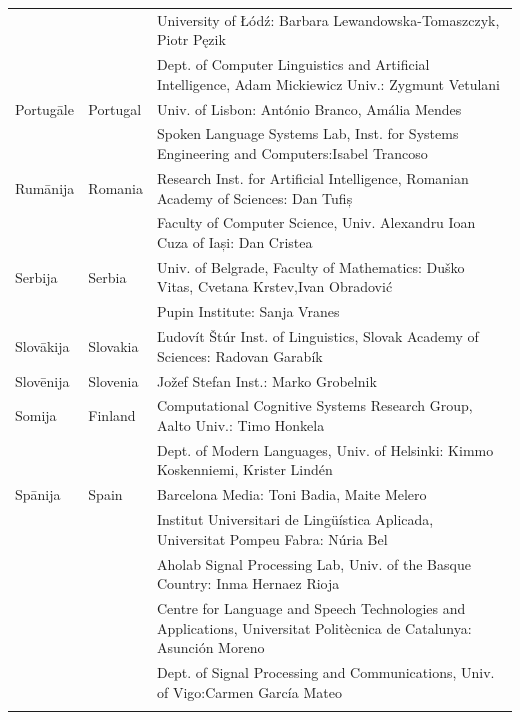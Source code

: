 \begin{longtable}{@{}llp{113mm}@{}}
  & & University of Łódź: Barbara Lewandowska-Tomaszczyk, Piotr Pęzik\\ \addlinespace
  & & Dept. of Computer Linguistics and Artificial Intelligence, Adam Mickiewicz Univ.: Zygmunt Vetulani \\ \addlinespace
  Portugāle & \textcolor{grey1}{Portugal} & Univ. of Lisbon: António Branco, Amália Mendes \\ \addlinespace
  & & Spoken Language Systems Lab, Inst. for Systems Engineering and Computers:\newline Isabel Trancoso \\ \addlinespace
  Rumānija & \textcolor{grey1}{Romania} & Research Inst. for Artificial Intelligence, Romanian Academy of Sciences: Dan Tufiș \\ \addlinespace
  & & Faculty of Computer Science, Univ. Alexandru Ioan Cuza of Iași: Dan Cristea \\ \addlinespace
  Serbija & \textcolor{grey1}{Serbia} & Univ. of Belgrade, Faculty of Mathematics: Duško Vitas, Cvetana Krstev,\newline Ivan Obradović \\ \addlinespace
  & & Pupin Institute: Sanja Vranes \\ \addlinespace  
  Slovākija & \textcolor{grey1}{Slovakia} & Ľudovít Štúr Inst. of Linguistics, Slovak Academy of Sciences: Radovan Garabík \\ \addlinespace 
  Slovēnija & \textcolor{grey1}{Slovenia} & Jožef Stefan Inst.: Marko Grobelnik \\ \addlinespace 
  Somija & \textcolor{grey1}{Finland} & Computational Cognitive Systems Research Group, Aalto Univ.: Timo Honkela\\ \addlinespace
  & & Dept. of Modern Languages, Univ. of Helsinki: Kimmo Koskenniemi, Krister Lindén \\ \addlinespace
  Spānija & \textcolor{grey1}{Spain} & Barcelona Media: Toni Badia, Maite Melero \\ \addlinespace 
  & & Institut Universitari de Lingüística Aplicada, Universitat Pompeu Fabra: Núria Bel \\ \addlinespace 
  & & Aholab Signal Processing Lab, Univ. of the Basque Country: Inma Hernaez Rioja \\ \addlinespace 
  & & Centre for Language and Speech Technologies and Applications, Universitat Politècnica de Catalunya:  Asunción Moreno \\ \addlinespace 
  & & Dept. of Signal Processing and Communications, Univ. of Vigo:\newline Carmen García Mateo \\ \addlinespace 

\end{longtable}
